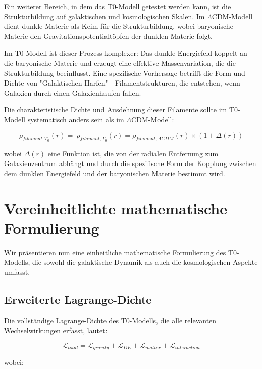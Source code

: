 \documentclass[a4paper,12pt]{article}
\begin{document}
Ein weiterer Bereich, in dem das T0-Modell getestet werden kann, ist die Strukturbildung auf galaktischen und kosmologischen Skalen. Im $\Lambda$CDM-Modell dient dunkle Materie als Keim für die Strukturbildung, wobei baryonische Materie den Gravitationspotentialtöpfen der dunklen Materie folgt.

Im T0-Modell ist dieser Prozess komplexer: Das dunkle Energiefeld koppelt an die baryonische Materie und erzeugt eine effektive Massenvariation, die die Strukturbildung beeinflusst. Eine spezifische Vorhersage betrifft die Form und Dichte von "Galaktischen Harfen" - Filamentstrukturen, die entstehen, wenn Galaxien durch einen Galaxienhaufen fallen.

Die charakteristische Dichte und Ausdehnung dieser Filamente sollte im T0-Modell systematisch anders sein als im $\Lambda$CDM-Modell:

\begin{equation}
	\rho_{filament,T_0}(r) = \	
	\rho_{filament,T_0}(r) = \rho_{filament,\Lambda CDM}(r) \times \left(1 + \Delta(r)\right)
	\end{equation}
	
	wobei $\Delta(r)$ eine Funktion ist, die von der radialen Entfernung zum Galaxienzentrum abhängt und durch die spezifische Form der Kopplung zwischen dem dunklen Energiefeld und der baryonischen Materie bestimmt wird.
	
	\section{Vereinheitlichte mathematische Formulierung}
	
	Wir präsentieren nun eine einheitliche mathematische Formulierung des T0-Modells, die sowohl die galaktische Dynamik als auch die kosmologischen Aspekte umfasst.
	
	\subsection{Erweiterte Lagrange-Dichte}
	
	Die vollständige Lagrange-Dichte des T0-Modells, die alle relevanten Wechselwirkungen erfasst, lautet:
	
	\begin{equation}
	\mathcal{L}_{total} = \mathcal{L}_{gravity} + \mathcal{L}_{DE} + \mathcal{L}_{matter} + \mathcal{L}_{interaction}
	\end{equation}
	
	wobei:
	
\end{document}
